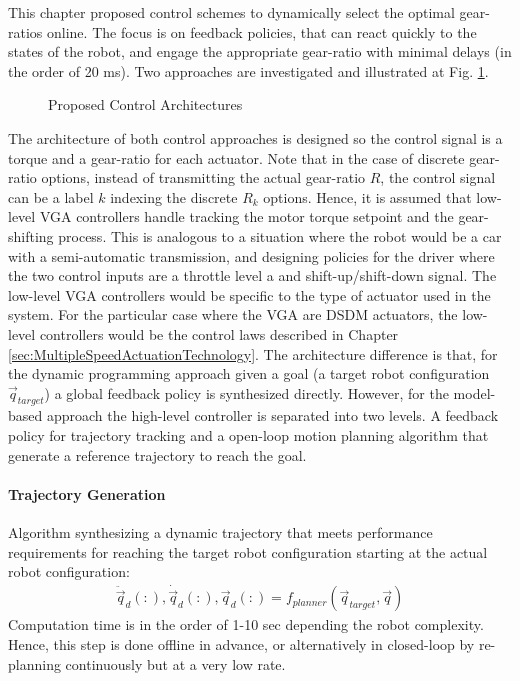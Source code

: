 This chapter proposed control schemes to dynamically select the optimal gear-ratios online. The focus is on feedback policies, that can react quickly to the states of the robot, and engage the appropriate gear-ratio with minimal delays (in the order of 20 ms). Two approaches are investigated and illustrated at Fig. \ref{fig:controlarchitectures}. 
%
\begin{figure}[H]
				\vspace{-10pt}
        \centering
				\hspace{+10pt}
        \caption{Proposed Control Architectures}
				\label{fig:controlarchitectures}
\end{figure}
%
The architecture of both control approaches is designed so the control signal is a torque and a gear-ratio for each actuator. Note that in the case of discrete gear-ratio options, instead of transmitting the actual gear-ratio $R$, the control signal can be a label $k$ indexing the discrete $R_k$ options. Hence, it is assumed that low-level VGA controllers handle tracking the motor torque setpoint and the gear-shifting process. This is analogous to a situation where the robot would be a car with a semi-automatic transmission, and designing policies for the driver where the two control inputs are a throttle level a and shift-up/shift-down signal. The low-level VGA controllers would be specific to the type of actuator used in the system. For the particular case where the VGA are DSDM actuators, the low-level controllers would be the control laws described in Chapter \ref{sec:MultipleSpeedActuationTechnology}. The architecture difference is that, for the dynamic programming approach given a goal (a target robot configuration $\vec{q}_{target}$) a global feedback policy is synthesized directly. However, for the model-based approach the high-level controller is separated into two levels. A feedback policy for trajectory tracking and a open-loop motion planning algorithm that generate a reference trajectory to reach the goal. 

\paragraph{Trajectory Generation} Algorithm synthesizing a dynamic trajectory that meets performance requirements for reaching the target robot configuration starting at the actual robot configuration: 
%
\begin{align}
  \ddot{\vec{q}}_d(:),\dot{\vec{q}}_d(:),\vec{q}_d(:) = f_{planner}(\vec{q}_{target}, \vec{q})
	\label{eq:trajgen}
\end{align}
%
Computation time is in the order of 1-10 sec depending the robot complexity. Hence, this step is done offline in advance, or alternatively in closed-loop by re-planning continuously but at a very low rate. 


